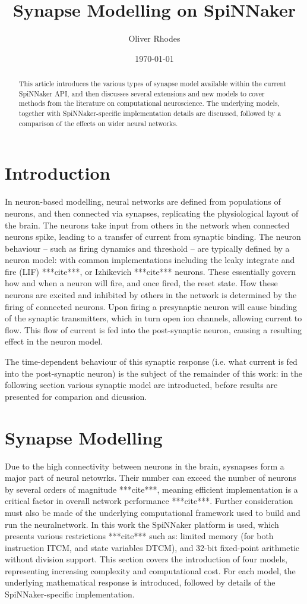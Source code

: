 \documentclass[12pt]{article}
\title{Synapse Modelling on SpiNNaker}
\author{Oliver Rhodes}
\date{\today}
\begin{document}
\maketitle

\begin{abstract}
This article introduces the various types of synapse model available within the
current SpiNNaker API, and then discusses several extensions and new models to
cover methods from the literature on computational neuroscience. The underlying
models, together with SpiNNaker-specific implementation details are discussed,
followed by a comparison of the effects on wider neural networks.
\end{abstract}

\section{Introduction}
In neuron-based modelling, neural networks are defined from populations of
neurons, and then connected via synapses, replicating the physiological layout
of the brain. The neurons take input from others in the network when connected
neurons spike, leading to a transfer of current from synaptic binding. The
neuron behaviour -- such as firing dynamics and threshold -- are typically
defined by a neuron model: with common implementations including the leaky
integrate and fire (LIF) ***cite***, or Izhikevich ***cite*** neurons. These
essentially govern how and when a neuron will fire, and once fired, the reset
state. How these neurons are excited and inhibited by others in the
network is determined by the firing of connected neurons. Upon firing a
presynaptic neuron will cause binding of the synaptic transmitters, which in
turn open ion channels, allowing current to flow. This flow of current is fed
into the post-synaptic neuron, causing a resulting effect in the neuron model.

The time-dependent behaviour of this synaptic response (i.e. what current
is fed into the post-synaptic neuron) is the subject of the remainder of this
work: in the following section various synaptic model are introducted, before
results are presented for comparion and dicussion.

\section{Synapse Modelling}
Due to the high connectivity between neurons in the brain, sysnapses form a
major part of neural netowrks. Their number can exceed the number of neurons by
several orders of magnitude ***cite***, meaning efficient implementation is a
critical factor in overall network performance ***cite***. Further consideration
must also be made of the underlying computational framework used to build and
run the neuralnetwork. In this work the SpiNNaker platform is used, which
presents various restrictions ***cite*** such as: limited memory (for both
instruction ITCM, and state variables DTCM), and 32-bit fixed-point arithmetic
without division support. This section covers the introduction of four models,
representing increasing complexity and computational cost. For each model, the
underlying mathematical response is introduced, followed by details of the
SpiNNaker-specific implementation.
\end{document}
